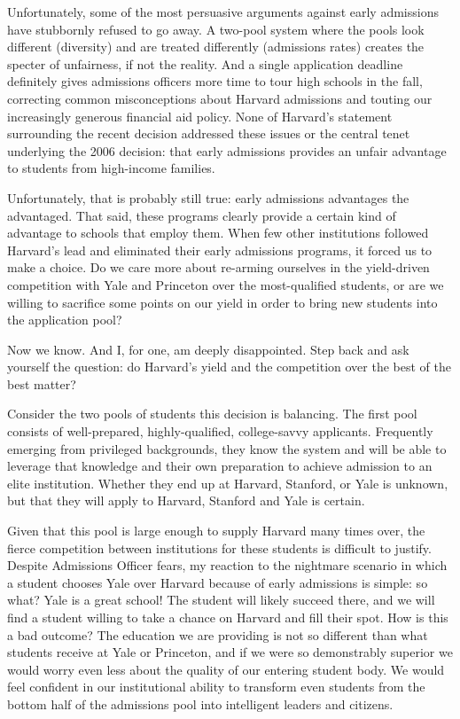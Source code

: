 Unfortunately, some of the most persuasive arguments against early admissions
have stubbornly refused to go away. A two-pool system where the pools look
different (diversity) and are treated differently (admissions rates) creates
the specter of unfairness, if not the reality. And a single application
deadline definitely gives admissions officers more time to tour high schools
in the fall, correcting common misconceptions about Harvard admissions and
touting our increasingly generous financial aid policy. None of Harvard's
statement surrounding the recent decision addressed these issues or the
central tenet underlying the 2006 decision: that early admissions provides an
unfair advantage to students from high-income families.

Unfortunately, that is probably still true: early admissions advantages the
advantaged. That said, these programs clearly provide a certain kind of
advantage to schools that employ them. When few other institutions followed
Harvard's lead and eliminated their early admissions programs, it forced us
to make a choice. Do we care more about re-arming ourselves in the
yield-driven competition with Yale and Princeton over the most-qualified
students, or are we willing to sacrifice some points on our yield in order to
bring new students into the application pool?

Now we know. And I, for one, am deeply disappointed. Step back and ask
yourself the question: do Harvard's yield and the competition over the best
of the best matter?

Consider the two pools of students this decision is balancing. The first pool
consists of well-prepared, highly-qualified, college-savvy applicants.
Frequently emerging from privileged backgrounds, they know the system and
will be able to leverage that knowledge and their own preparation to achieve
admission to an elite institution. Whether they end up at Harvard, Stanford,
or Yale is unknown, but that they will apply to Harvard, Stanford and Yale is
certain.

Given that this pool is large enough to supply Harvard many times over, the
fierce competition between institutions for these students is difficult to
justify. Despite Admissions Officer fears, my reaction to the nightmare
scenario in which a student chooses Yale over Harvard because of early
admissions is simple: so what? Yale is a great school! The student will
likely succeed there, and we will find a student willing to take a chance on
Harvard and fill their spot. How is this a bad outcome? The education we are
providing is not so different than what students receive at Yale or
Princeton, and if we were so demonstrably superior we would worry even less
about the quality of our entering student body. We would feel confident in
our institutional ability to transform even students from the bottom half of
the admissions pool into intelligent leaders and citizens.

